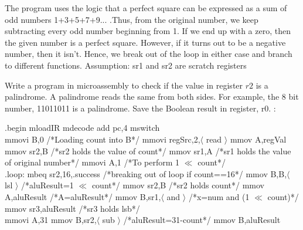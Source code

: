 \begin{ExerciseList}
The program uses the logic that a perfect square can be expressed as a sum of odd numbers 1+3+5+7+9... .Thus, from the original number, we keep subtracting every odd number beginning from 1. If we end up with a zero, then the given number is a perfect square. However, if it turns out to be a negative number, then it isn't. Hence, we break out of the loop in either case and branch to different functions.\newline
Assumption: sr1 and sr2 are scratch registers

\Exercise
Write a program in microassembly to check if the value in register $r2$ is a palindrome. A palindrome
reads the same from both sides. For example, the 8 bit number, 11011011 is a palindrome. Save the Boolean result
in register, r0.
\Answer:

.begin\newline
mloadIR\newline
mdecode\newline
add pc,4\newline
mswitch\newline \\
mmovi B,0  /*Loading count into B*/\newline
mmovi regSrc,2,$\langle$ read $\rangle$\newline
mmov A,regVal\newline \\ 
mmov sr2,B  /*sr2 holds the value of count*/\newline
mmov sr1,A  /*sr1 holds the value of original number*/\newline
mmovi A,1   /*To perform 1 $\ll$ count*/ \\
.loop:\newline
mbeq sr2,16,.success /*breaking out of loop if count==16*/\newline
mmov B,B,$\langle$ lsl $\rangle$  /*aluResult=1 $\ll$ count*/\newline
mmov sr2,B  /*sr2 holds count*/\newline
mmov A,aluResult  /*A=aluResult*/\newline
mmov B,sr1,$\langle$ and $\rangle$    /*x=num and (1 $\ll$ count)*/\newline
mmov sr3,aluResult  /*sr3 holds lsb*/\newline \\
mmovi A,31\newline
mmov B,sr2,$\langle$ sub $\rangle$   /*aluResult=31-count*/\newline
mmov B,aluResult\newline

\end{ExerciseList}
